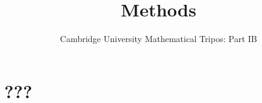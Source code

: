 \documentclass{article}
\title{Methods}
\author{Cambridge University Mathematical Tripos: Part IB}
\begin{document}
\maketitle

\tableofcontentsnewpage{}

\section{???}

\end{document}
